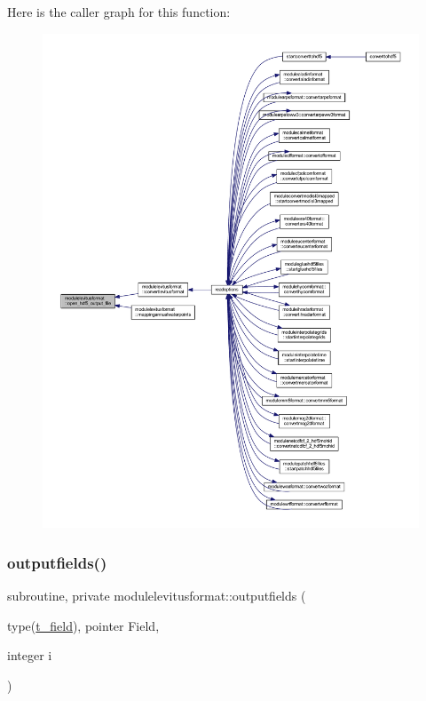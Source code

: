 Here is the caller graph for this function\+:\nopagebreak
\begin{figure}[H]
\begin{center}
\leavevmode
\includegraphics[width=350pt]{namespacemodulelevitusformat_a43a015e528279df64ee7b5856bb08147_icgraph}
\end{center}
\end{figure}
\mbox{\label{namespacemodulelevitusformat_aabed50c7effe5d563a35ce0013a4ec93}} 
\subsubsection{\texorpdfstring{outputfields()}{outputfields()}}
{\footnotesize\ttfamily subroutine, private modulelevitusformat\+::outputfields (\begin{DoxyParamCaption}\item[{type(\mbox{\hyperlink{structmodulelevitusformat_1_1t__field}{t\+\_\+field}}), pointer}]{Field,  }\item[{integer}]{i }\end{DoxyParamCaption})\hspace{0.3cm}{\ttfamily [private]}}

